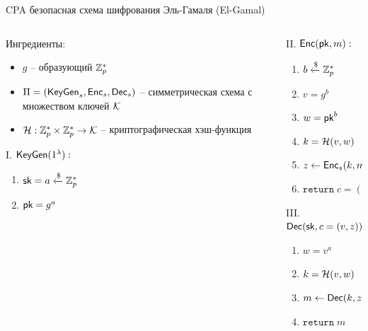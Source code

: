 \documentclass[usenames,dvipsnames,8pt,aspectratio=169]{beamer}
\begin{document}
\begin{frame}{CPA безопасная схема шифрования Эль-Гамаля (El-Gamal)}
	\Large 
	\begin{columns}[T]
		\begin{column}{0.50\textwidth}
			{\color{Orange}Ингредиенты:}
			\begin{itemize}
				\itemsep 5pt
				\item  $g$ -- образующий ${{\mathbb Z}}_p^\ast$ 
				\item $\Pi = (\textsf{KeyGen}_s, \textsf{Enc}_s, \textsf{Dec}_s )$ -- симметрическая схема с множеством ключей $\mathcal{K}$
				\item $\mathcal{H}: {{\mathbb Z}}_p^\ast \times  {{\mathbb Z}}_p^\ast \rightarrow \mathcal{K}$ -- криптографическая хэш-функция
			\end{itemize} 
		\vspace{20pt}
			{\color{Orange} I. $\mathsf{\textsf{KeyGen}}(1^\lambda):$}
			\begin{enumerate}
				\itemsep4pt
				\item $\textsf{sk} = a \xleftarrow{\$} {{\mathbb Z}}_p^\ast$
				\item $\textsf{pk} = g^a$
			\end{enumerate}
		\end{column}
		\begin{column}{0.45\textwidth}
		{\color{Orange} II. $\textsf{Enc}(\textsf{pk}, m):$}
			\begin{enumerate}
				\itemsep3pt
				\item $b \xleftarrow{\$} {{\mathbb Z}}_p^\ast$
				\item $v = g^b$ 
				\item $w = \textsf{pk}^b$
				\item $k = \mathcal{H}(v, w)$
				\item $z \gets \textsf{Enc}_s(k, m)$
				\item $\mathtt{return} \; c = (v, z)$
			\end{enumerate}
		\vspace{15pt}
			{\color{Orange} III. $\textsf{Dec}(\textsf{sk}, c = (v, z)):$}
			\begin{enumerate}
				\itemsep3pt
				\item $w = v^a$
				\item $k = \mathcal{H}(v, w)$
				\item $m \gets \textsf{Dec}(k, z)$
				\item $\mathtt{return} \; m$ \\
			\end{enumerate}
		\end{column}
	\end{columns}
\end{frame}
\end{document}
